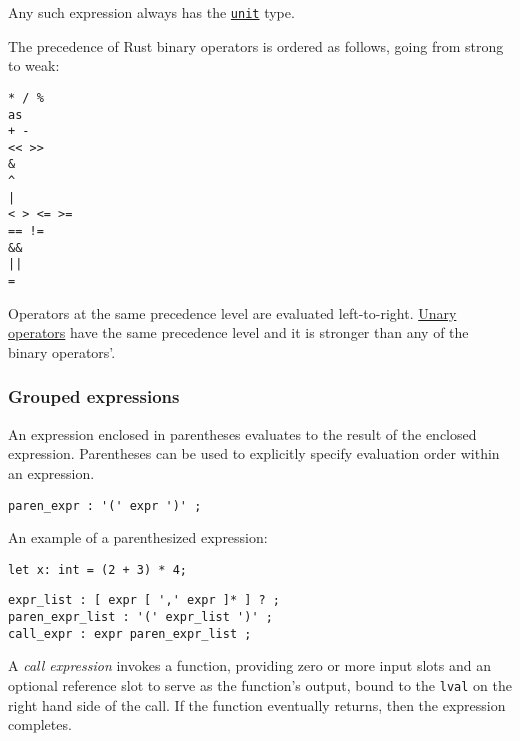 \documentclass[]{article}
\begin{document}
Any such expression always has the
\hyperref[primitive-types]{\texttt{unit}} type.


The precedence of Rust binary operators is ordered as follows, going
from strong to weak:

\begin{verbatim}
* / %
as
+ -
<< >>
&
^
|
< > <= >=
== !=
&&
||
=
\end{verbatim}

Operators at the same precedence level are evaluated left-to-right.
\hyperref[unary-operator-expressions]{Unary operators} have the same
precedence level and it is stronger than any of the binary operators'.

\subsubsection{Grouped expressions}\label{grouped-expressions}

An expression enclosed in parentheses evaluates to the result of the
enclosed expression. Parentheses can be used to explicitly specify
evaluation order within an expression.

\begin{verbatim}
paren_expr : '(' expr ')' ;
\end{verbatim}

An example of a parenthesized expression:

\begin{verbatim}
let x: int = (2 + 3) * 4;
\end{verbatim}


\begin{verbatim}
expr_list : [ expr [ ',' expr ]* ] ? ;
paren_expr_list : '(' expr_list ')' ;
call_expr : expr paren_expr_list ;
\end{verbatim}

A \emph{call expression} invokes a function, providing zero or more
input slots and an optional reference slot to serve as the function's
output, bound to the \texttt{lval} on the right hand side of the call.
If the function eventually returns, then the expression completes.
\end{document}

